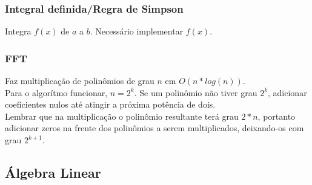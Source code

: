 \subsubsection{Integral definida/Regra de Simpson}
Integra $f(x)$ de $a$ a $b$. Necessário implementar $f(x)$.

\divisor

\subsubsection{FFT}
Faz multiplica\c{c}\~{a}o de polin\^{o}mios de grau $n$ em $O(n*log(n))$.\\
Para o algor\'{i}tmo funcionar, $n=2^k$. Se um polin\^{o}mio n\~{a}o tiver grau $2^k$, adicionar coeficientes nulos at\'{e} atingir a pr\'{o}xima pot\^{e}ncia de dois.\\
Lembrar que na multiplica\c{c}\~{a}o o polin\^{o}mio resultante ter\'{a} grau $2*n$, portanto adicionar zeros na frente dos polin\^{o}mios a serem multiplicados, deixando-os com grau $2^{k+1}$.

\divisor


\subsection{Álgebra Linear}

